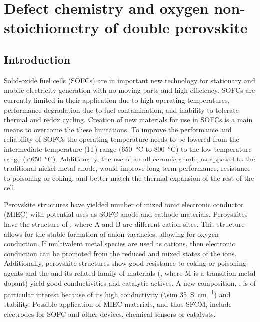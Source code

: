 
\chapter{{Defect chemistry and oxygen non-stoichiometry of double perovskite }}

\section{Introduction}
    Solid-oxide fuel cells (SOFCs) are in important new technology for stationary and mobile electricity generation with no moving parts and high efficiency.
    SOFCs are currently limited in their application due to high operating temperatures, performance degradation due to fuel contamination, and inability to tolerate thermal and redox cycling.
    Creation of new materials for use in SOFCs is a main means to overcome the these limitations.
    To improve the performance and reliability of SOFCs the operating temperature needs to be lowered from the intermediate temperature (IT) range (\SI{650}{\celsius} to \SI{800}{\celsius}) to the low temperature range (\textless\SI{650}{\celsius}).\cite{Wachsman2011a}
    Additionally, the use of an all-ceramic anode, as apposed to the traditional nickel metal anode, would improve long term performance, resistance to poisoning or coking, and better match the thermal expansion of the rest of the cell.

    Perovskite structures have yielded number of mixed ionic electronic conductor (MIEC) with potential uses as SOFC anode and cathode materials.
    Perovskites have the structure of , where A and B are different cation sites.
    This structure allows for the stable formation of anion vacancies, allowing for oxygen conduction.\cite{Bernuy-Lopez2007}
    If multivalent metal species are used as cations, then electronic conduction can be promoted from the reduced and mixed states of the ions.\cite{Huang2006}\cite{Goodenough2007}
    Additionally, perovskite structures show good resistance to coking or poisoning agents and the \cite{Song2014}
     and its related family of materials (, where M is a transition metal dopant) yield good conductivities and catalytic actives.
    A new composition, , is of particular interest because of its high conductivity (\SI{\sim 35}{S\per\centi\meter}) and stability.\cite{Hussaina,Pan,Hussain}
    Possible application of MIEC materials, and thus SFCM, include electrodes for SOFC and other devices, chemical sensors or catalysts.\cite{Mizusaki1985}

